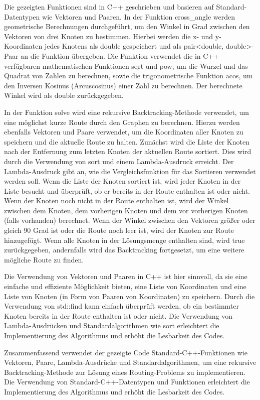 \documentclass[a4paper,10pt,ngerman]{scrartcl}
\begin{document}
    Die gezeigten Funktionen sind in C++ geschrieben und basieren auf Standard-Datentypen wie Vektoren und Paaren.
    In der Funktion cross\_angle werden geometrische Berechnungen durchgeführt, um den Winkel in Grad zwischen den Vektoren von drei Knoten zu bestimmen.
    Hierbei werden die x- und y-Koordinaten jedes Knotens als double gespeichert und als pair<double, double>-Paar an die Funktion übergeben.
    Die Funktion verwendet die in C++ verfügbaren mathematischen Funktionen sqrt und pow, um die Wurzel und das Quadrat von Zahlen zu berechnen,
    sowie die trigonometrische Funktion acos, um den Inversen Kosinus (Arcuscosinus) einer Zahl zu berechnen.
    Der berechnete Winkel wird als double zurückgegeben.

    In der Funktion solve wird eine rekursive Backtracking-Methode verwendet, um eine möglichst kurze Route durch den Graphen zu berechnen.
    Hierzu werden ebenfalls Vektoren und Paare verwendet, um die Koordinaten aller Knoten zu speichern und die aktuelle Route zu halten.
    Zunächst wird die Liste der Knoten nach der Entfernung zum letzten Knoten der aktuellen Route sortiert.
    Dies wird durch die Verwendung von sort und einem Lambda-Ausdruck erreicht.
    Der Lambda-Ausdruck gibt an, wie die Vergleichsfunktion für das Sortieren verwendet werden soll.
    Wenn die Liste der Knoten sortiert ist, wird jeder Knoten in der Liste besucht und überprüft, ob er bereits in der Route enthalten ist oder nicht.
    Wenn der Knoten noch nicht in der Route enthalten ist, wird der Winkel zwischen dem Knoten, dem vorherigen Knoten und dem vor vorherigen Knoten (falls vorhanden) berechnet.
    Wenn der Winkel zwischen den Vektoren größer oder gleich 90 Grad ist oder die Route noch leer ist, wird der Knoten zur Route hinzugefügt.
    Wenn alle Knoten in der Lösungsmenge enthalten sind, wird true zurückgegeben, andernfalls wird das Backtracking fortgesetzt, um eine weitere mögliche Route zu finden.

    Die Verwendung von Vektoren und Paaren in C++ ist hier sinnvoll, da sie eine einfache und effiziente Möglichkeit bieten,
    eine Liste von Koordinaten und eine Liste von Knoten (in Form von Paaren von Koordinaten) zu speichern.
    Durch die Verwendung von std::find kann einfach überprüft werden, ob ein bestimmter Knoten bereits in der Route enthalten ist oder nicht.
    Die Verwendung von Lambda-Ausdrücken und Standardalgorithmen wie sort erleichtert die Implementierung des Algorithmus und erhöht die Lesbarkeit des Codes.

    Zusammenfassend verwendet der gezeigte Code Standard-C++-Funktionen wie Vektoren, Paare, Lambda-Ausdrücke und Standardalgorithmen,
    um eine rekursive Backtracking-Methode zur Lösung eines Routing-Problems zu implementieren.
    Die Verwendung von Standard-C++-Datentypen und Funktionen erleichtert die Implementierung des Algorithmus und erhöht die Lesbarkeit des Codes.
\end{document}
